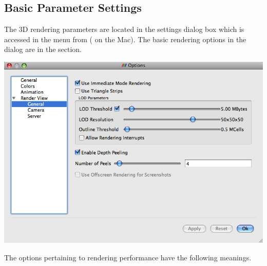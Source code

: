 \subsection{Basic Parameter Settings}

The 3D rendering parameters are located in the settings dialog box which is
accessed in the menu from  \ra {} ( \ra
{} on the Mac).  The basic rendering options in the dialog
are in the  \ra {} section.

\begin{inlinefig}
  \includegraphics[width=\scw]{images/SettingsRendering}
\end{inlinefig}

The options pertaining to rendering performance have the following
meanings.

